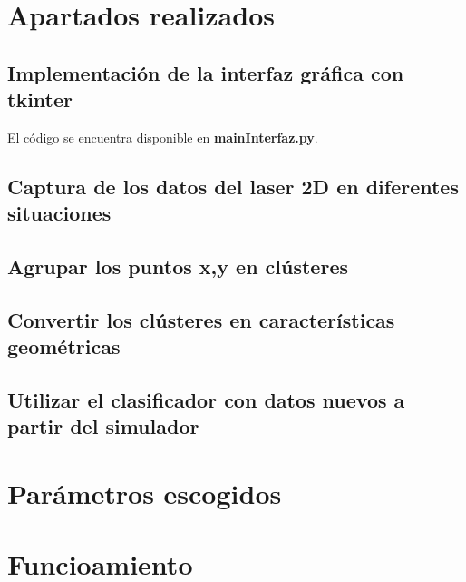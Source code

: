 \chapter{Apartados realizados}

\section{Implementación de la interfaz gráfica con tkinter}

El código se encuentra disponible en \textbf{mainInterfaz.py}.





\section{Captura de los datos del laser 2D en diferentes situaciones}

\section{Agrupar los puntos x,y en clústeres}

\section{Convertir los clústeres en características geométricas}

\section{Utilizar el clasificador con datos nuevos a partir del simulador}

\chapter{Parámetros escogidos}

\chapter{Funcioamiento}

